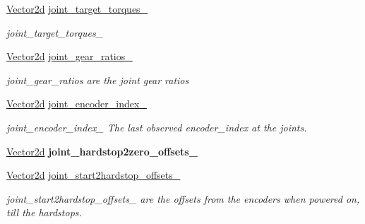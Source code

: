\begin{DoxyCompactItemize}
\hyperlink{common__header_8hpp_acb6916bc8c9fe9d98c484fd4cc201447}{Vector2d} \hyperlink{classblmc__robots_1_1Stuggihop_a0cc32133b3a6afd375eaee0537adfdfb}{joint\+\_\+target\+\_\+torques\+\_\+}
\begin{DoxyCompactList}\small\item\em joint\+\_\+target\+\_\+torques\+\_\+ \end{DoxyCompactList}\item 
\mbox{\label{classblmc__robots_1_1Stuggihop_ab30bb44a129492efbba9412c8f408802}} 
\hyperlink{common__header_8hpp_acb6916bc8c9fe9d98c484fd4cc201447}{Vector2d} \hyperlink{classblmc__robots_1_1Stuggihop_ab30bb44a129492efbba9412c8f408802}{joint\+\_\+gear\+\_\+ratios\+\_\+}
\begin{DoxyCompactList}\small\item\em joint\+\_\+gear\+\_\+ratios are the joint gear ratios \end{DoxyCompactList}\item 
\mbox{\label{classblmc__robots_1_1Stuggihop_aabd468b6cbe31a5cba60fd8958da3d1a}} 
\hyperlink{common__header_8hpp_acb6916bc8c9fe9d98c484fd4cc201447}{Vector2d} \hyperlink{classblmc__robots_1_1Stuggihop_aabd468b6cbe31a5cba60fd8958da3d1a}{joint\+\_\+encoder\+\_\+index\+\_\+}
\begin{DoxyCompactList}\small\item\em joint\+\_\+encoder\+\_\+index\+\_\+ The last observed encoder\+\_\+index at the joints. \end{DoxyCompactList}\item 
\mbox{\label{classblmc__robots_1_1Stuggihop_af724a5acb73f9e77db43bdeb2d91a42e}} 
\hyperlink{common__header_8hpp_acb6916bc8c9fe9d98c484fd4cc201447}{Vector2d} {\bfseries joint\+\_\+hardstop2zero\+\_\+offsets\+\_\+}
\item 
\hyperlink{common__header_8hpp_acb6916bc8c9fe9d98c484fd4cc201447}{Vector2d} \hyperlink{classblmc__robots_1_1Stuggihop_a63813a55789c75aa4e4c7d1c783c857d}{joint\+\_\+start2hardstop\+\_\+offsets\+\_\+}
\begin{DoxyCompactList}\small\item\em joint\+\_\+start2hardstop\+\_\+offsets\+\_\+ are the offsets from the encoders when powered on, till the hardstops. \end{DoxyCompactList}\item 

\end{DoxyCompactItemize}
